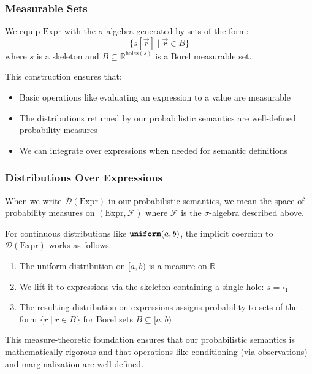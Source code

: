 \subsubsection{Measurable Sets}

We equip $\text{Expr}$ with the $\sigma$-algebra generated by sets of the form:
\[
\{s[\vec{r}] \mid \vec{r} \in B\}
\]
where $s$ is a skeleton and $B \subseteq \mathbb{R}^{\text{holes}(s)}$ is a Borel measurable set.

This construction ensures that:
\begin{itemize}
    \item Basic operations like evaluating an expression to a value are measurable
    \item The distributions returned by our probabilistic semantics are well-defined probability measures
    \item We can integrate over expressions when needed for semantic definitions
\end{itemize}

\subsubsection{Distributions Over Expressions}

When we write $\mathcal{D}(\text{Expr})$ in our probabilistic semantics, we mean the space of probability measures on $(\text{Expr}, \mathcal{F})$ where $\mathcal{F}$ is the $\sigma$-algebra described above.

For continuous distributions like $\text{\ttfamily\bfseries uniform}(a, b)$, the implicit coercion to $\mathcal{D}(\text{Expr})$ works as follows:
\begin{enumerate}
    \item The uniform distribution on $[a, b)$ is a measure on $\mathbb{R}$
    \item We lift it to expressions via the skeleton containing a single hole: $s = \square_1$
    \item The resulting distribution on expressions assigns probability to sets of the form $\{r \mid r \in B\}$ for Borel sets $B \subseteq [a, b)$
\end{enumerate}

This measure-theoretic foundation ensures that our probabilistic semantics is mathematically rigorous and that operations like conditioning (via observations) and marginalization are well-defined.